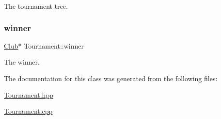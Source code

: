 The tournament tree. 

\hypertarget{class_tournament_a4e662ffc9d1c3c868bb6db5c60be5c58}{}\label{class_tournament_a4e662ffc9d1c3c868bb6db5c60be5c58} 
\subsubsection{\texorpdfstring{winner}{winner}}
{\footnotesize\ttfamily \hyperlink{class_club}{Club}$\ast$ Tournament\+::winner\hspace{0.3cm}{\ttfamily [private]}}



The winner. 



The documentation for this class was generated from the following files\+:\begin{DoxyCompactItemize}
\item 
\hyperlink{_tournament_8hpp}{Tournament.\+hpp}\item 
\hyperlink{_tournament_8cpp}{Tournament.\+cpp}\end{DoxyCompactItemize}
